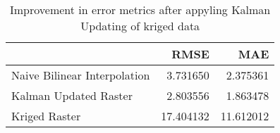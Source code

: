 \begin{table}
\caption{Improvement in error metrics after appyling Kalman Updating of kriged data}
\label{tab:oahu3_lidar_error}
\begin{tabular}{lrr}
\toprule
 & RMSE & MAE \\
\midrule
Naive Bilinear Interpolation & 3.731650 & 2.375361 \\
Kalman Updated Raster & 2.803556 & 1.863478 \\
Kriged Raster & 17.404132 & 11.612012 \\
\bottomrule
\end{tabular}
\end{table}
